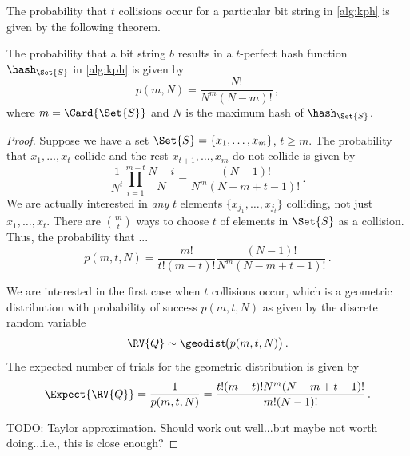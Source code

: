 \documentclass[ ../main.tex]{subfiles}
\begin{document}
The probability that $t$ collisions occur for a particular bit string in \cref{alg:kph} is given by the following theorem.
\begin{theorem}
	The probability that a bit string $b$ results in a $t$-perfect hash function $\hash_{\Set{S}}$ in \cref{alg:kph} is given by
	\begin{equation}
	\label{eq:p_m_N}
	p(m,N) = \frac{N!}{N^m (N-m)!}\,,
	\end{equation}
	where $m = \Card{\Set{S}}$ and $N$ is the maximum hash of $\hash_{\Set{S}}$.
\end{theorem}
\begin{proof}
	Suppose we have a set $\Set{S} = \{x_1,\ldots,x_m\}$, $t \geq m$. The probability that $x_1,\ldots,x_t$ collide and the rest $x_{t+1},\ldots,x_m$ do not collide is given by
	\begin{equation}
	\frac{1}{N^t} \prod_{i=1}^{m-t} \frac{N - i}{N} = \frac{(N-1)!}{N^m(N-m+t-1)!}\,.
	\end{equation}
	We are actually interested in \emph{any} $t$ elements $\{x_{j_1},\ldots,x_{j_t}\}$ colliding, not just $x_1,\ldots,x_t$. There are $m \choose t$ ways to choose $t$ of elements in $\Set{S}$ as a collision. Thus, the probability that ...
	\begin{equation}
	p(m,t,N) = \frac{m!}{t!(m-t)!} \frac{(N-1)!}{N^m(N-m+t-1)!}\,.
	\end{equation}
	
	We are interested in the first case when $t$ collisions occur, which is a geometric distribution with probability of success $p(m,t,N)$ as given by the discrete random variable
	\begin{equation}
	\RV{Q} \sim \geodist\!\bigl(p\!\left(m,t,N\right)\bigr)\,.
	\end{equation}
	The expected number of trials for the geometric distribution is given by
	\begin{equation}
	\Expect{\RV{Q}} = \frac{1}{p(m,t,N)} = \frac{t!(m-t)!N^m(N-m+t-1)!}{m!(N-1)!}\,.
	\end{equation}
	
	TODO: Taylor approximation. Should work out well...but maybe not worth doing...i.e., this is close enough?
	

\end{proof}
\end{document}
